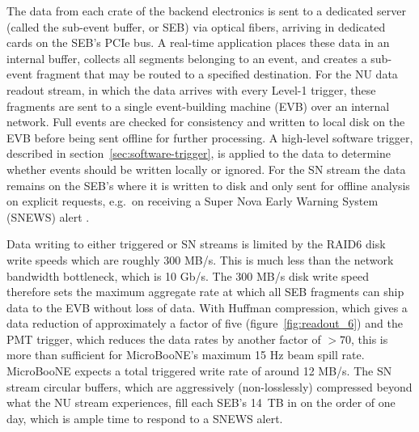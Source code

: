 The data from each crate of the backend electronics is sent to a dedicated server (called the sub-event buffer, or SEB) via optical fibers, arriving in dedicated cards on the SEB's PCIe bus. A real-time application places these data in an internal buffer, collects all segments belonging to an event, and creates a sub-event fragment that may be routed to a specified destination.  For the NU data readout stream, in which the data arrives with every Level-1 trigger, these fragments are sent to a single event-building machine (EVB) over an internal network. Full events are checked for consistency and written to local disk on the EVB before being sent offline for further processing. A high-level software trigger, described in section~\ref{sec:software-trigger}, is applied to the data to determine whether events should be written locally or ignored. For the SN stream the data remains on the SEB's where it is written to disk and only sent for offline analysis on explicit requests, e.g.~on receiving a Super Nova Early Warning System (SNEWS) alert \cite{Scholberg:2008fa}.

Data writing to either triggered or SN streams is limited by the RAID6 disk write speeds which are roughly 300 MB/s. This is much less than the network bandwidth bottleneck, which is 10 Gb/s. The 300 MB/s disk write speed therefore sets the maximum aggregate rate at which all SEB fragments can ship data to the EVB without loss of data. With Huffman compression, which gives a data reduction of approximately a factor of five (figure~\ref{fig:readout_6}) and the PMT trigger, which reduces the data rates by another factor of $>70$, this is more than sufficient for MicroBooNE's maximum 15 Hz beam spill rate. MicroBooNE expects a total triggered write rate of around 12 MB/s. The SN stream circular buffers, which are aggressively (non-losslessly) compressed beyond what the NU stream experiences, fill each SEB's 14~TB in on the order of one day, which is ample time to respond to a SNEWS alert.

